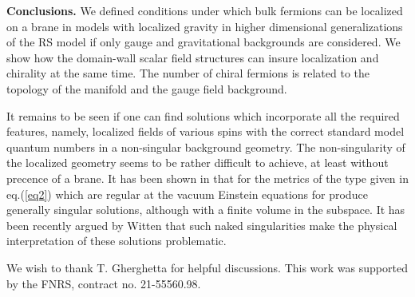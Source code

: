 \documentclass[a4paper,12pt]{article}
\begin{document}
{\bf Conclusions.} We defined conditions under which bulk
fermions can be localized on a brane in models with localized gravity
in higher dimensional generalizations of the RS model if only gauge
and gravitational backgrounds are considered. We show how the domain-wall
scalar field structures can insure localization and chirality at the
same time. The number of chiral fermions is related to the topology
of the manifold \coordHE{} and the gauge field background.

It remains to be seen if one can find solutions which incorporate all
the required features, namely, localized fields of various spins with
the correct standard model quantum numbers in a non-singular
background geometry. The non-singularity of the localized geometry
seems to be rather difficult to achieve, at least without precence of
a brane. It has been shown in \cite{seif} that for the metrics of the
type given in eq.(\ref{eq2}) which are regular at \coordHE{} the vacuum
Einstein equations for \coordHE{} produce generally singular solutions,
although with a finite volume in the \coordHE{} subspace. It has been
recently argued by Witten \cite{Witt} that such naked singularities
make the physical interpretation of these solutions problematic.

 We wish to thank T. Gherghetta
for helpful discussions. This work was supported by the
FNRS,  contract no. 21-55560.98.
\end{document}
